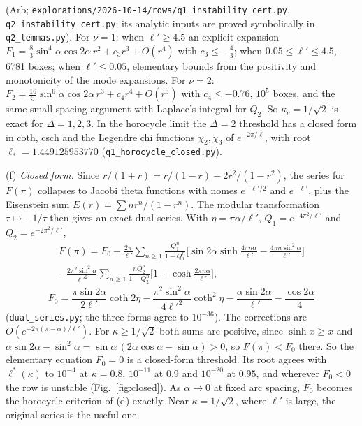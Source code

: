 \documentclass[11pt]{article}
\theoremstyle{remark}
\begin{document}
(Arb; \texttt{explorations/2026-10-14/rows/q1\_instability\_cert.py}, \texttt{q2\_instability\_cert.py}; its analytic inputs are proved symbolically in \texttt{q2\_lemmas.py}). For
$\nu=1$: when $\ell'\ge4.5$ an explicit expansion $F_1=\tfrac83\sin^4\!\alpha\cos2\alpha\,r^2+c_3r^3+O(r^4)$ with $c_3\le-\tfrac43$;
when $0.05\le\ell'\le4.5$, 6781 boxes; when $\ell'\le0.05$, elementary bounds from the positivity and monotonicity of the mode
expansions. For $\nu=2$: $F_2=\tfrac{16}5\sin^6\!\alpha\cos2\alpha\,r^3+c_4r^4+O(r^5)$ with $c_4\le-0.76$, $10^5$ boxes, and
the same small-spacing argument with Laplace's integral for $Q_2$. So $\kappa_c=1/\sqrt2$ is exact for $\Delta=1,2,3$. In the horocycle limit the $\Delta=2$
threshold has a closed form in coth, csch and the Legendre chi functions $\chi_2,\chi_3$ of $e^{-2\pi/\ell}$, with root
$\ell_*=1.449125953770$ (\texttt{q1\_horocycle\_closed.py}).

(f) \emph{Closed form.} Since $r/(1+r)=r/(1-r)-2r^2/(1-r^2)$, the series for $F(\pi)$ collapses to Jacobi theta functions with
nomes $e^{-\ell'/2}$ and $e^{-\ell'}$, plus the Eisenstein sum $E(r)=\sum nr^n/(1-r^n)$. The modular transformation
$\tau\mapsto-1/\tau$ then gives an exact dual series. With $\eta=\pi\alpha/\ell'$, $Q_1=e^{-4\pi^2/\ell'}$ and $Q_2=e^{-2\pi^2/\ell'}$,
\begin{multline*}
F(\pi)=F_0-\frac{2\pi}{\ell'}\sum_{n\ge1}\frac{Q_1^n}{1-Q_1^n}\Big[\sin2\alpha\sinh\frac{4\pi n\alpha}{\ell'}-\frac{4\pi n\sin^2\!\alpha}{\ell'}\Big]\\
-\frac{2\pi^2\sin^2\!\alpha}{\ell'^2}\sum_{n\ge1}\frac{nQ_2^n}{1-Q_2^n}\Big[1+\cosh\frac{2\pi n\alpha}{\ell'}\Big],
\end{multline*}
\[
F_0=\frac{\pi\sin2\alpha}{2\ell'}\coth2\eta-\frac{\pi^2\sin^2\!\alpha}{4\ell'^2}\coth^2\eta-\frac{\alpha\sin2\alpha}{\ell'}-\frac{\cos2\alpha}4
\]
(\texttt{dual\_series.py}; the three forms agree to $10^{-36}$). The corrections are $O(e^{-2\pi(\pi-\alpha)/\ell'})$. For
$\kappa\ge1/\sqrt2$ both sums are positive, since $\sinh x\ge x$ and $\alpha\sin2\alpha-\sin^2\!\alpha=\sin\alpha\,(2\alpha\cos\alpha-\sin\alpha)>0$,
so $F(\pi)<F_0$ there. So the elementary equation $F_0=0$ is a closed-form threshold. Its root agrees with $\ell^*(\kappa)$ to
$10^{-4}$ at $\kappa=0.8$, $10^{-11}$ at $0.9$ and $10^{-20}$ at $0.95$, and wherever $F_0<0$ the row is unstable
(Fig.~\ref{fig:closed}). As $\alpha\to0$ at fixed arc spacing, $F_0$ becomes the horocycle criterion of (d) exactly. Near
$\kappa=1/\sqrt2$, where $\ell'$ is large, the original series is the useful one.
\end{document}
